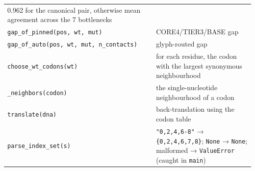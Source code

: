 \begin{longtable}[]{@{}ll@{}}
\begin{minipage}[t]{0.47\columnwidth}
0.962 for the canonical pair, otherwise mean agreement across the 7
bottlenecks\strut
\end{minipage}\tabularnewline
\begin{minipage}[t]{0.47\columnwidth}\raggedright
\texttt{gap\_of\_pinned(pos,\ wt,\ mut)}\strut
\end{minipage} & \begin{minipage}[t]{0.47\columnwidth}\raggedright
CORE4/TIER3/BASE gap\strut
\end{minipage}\tabularnewline
\begin{minipage}[t]{0.47\columnwidth}\raggedright
\texttt{gap\_of\_auto(pos,\ wt,\ mut,\ n\_contacts)}\strut
\end{minipage} & \begin{minipage}[t]{0.47\columnwidth}\raggedright
glyph-routed gap\strut
\end{minipage}\tabularnewline
\begin{minipage}[t]{0.47\columnwidth}\raggedright
\texttt{choose\_wt\_codons(wt)}\strut
\end{minipage} & \begin{minipage}[t]{0.47\columnwidth}\raggedright
for each residue, the codon with the largest synonymous
neighbourhood\strut
\end{minipage}\tabularnewline
\begin{minipage}[t]{0.47\columnwidth}\raggedright
\texttt{\_neighbors(codon)}\strut
\end{minipage} & \begin{minipage}[t]{0.47\columnwidth}\raggedright
the single-nucleotide neighbourhood of a codon\strut
\end{minipage}\tabularnewline
\begin{minipage}[t]{0.47\columnwidth}\raggedright
\texttt{translate(dna)}\strut
\end{minipage} & \begin{minipage}[t]{0.47\columnwidth}\raggedright
back-translation using the codon table\strut
\end{minipage}\tabularnewline
\begin{minipage}[t]{0.47\columnwidth}\raggedright
\texttt{parse\_index\_set(s)}\strut
\end{minipage} & \begin{minipage}[t]{0.47\columnwidth}\raggedright
\texttt{"0,2,4,6-8"} → \texttt{\{0,2,4,6,7,8\}}; \texttt{None} →
\texttt{None}; malformed → \texttt{ValueError} (caught in
\texttt{main})\strut
\end{minipage}\tabularnewline

\end{longtable}
